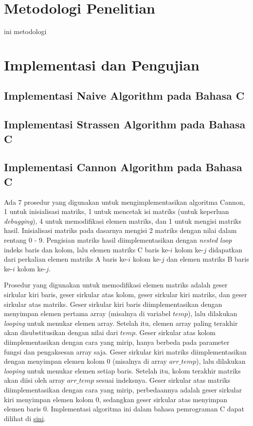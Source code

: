 \documentclass[conference]{IEEEtran}
\begin{document}
\section{Metodologi Penelitian}
ini metodologi

\section{Implementasi dan Pengujian}

\subsection{Implementasi Naive Algorithm pada Bahasa C}

\subsection{Implementasi Strassen Algorithm pada Bahasa C}

\subsection{Implementasi Cannon Algorithm pada Bahasa C}
Ada 7 prosedur yang digunakan untuk mengimplementasikan algoritma Cannon, 1 untuk inisialisasi matriks, 1 untuk mencetak isi matriks (untuk keperluan \textit{debugging}), 
4 untuk memodifikasi elemen matriks, dan 1 untuk mengisi matriks hasil.
Inisialisasi matriks pada dasarnya mengisi 2 matriks dengan nilai dalam rentang 0 - 9.
Pengisian matriks hasil diimplementasikan dengan \textit{nested loop} indeks baris dan kolom, 
lalu elemen matriks C baris ke-$i$ kolom ke-$j$ didapatkan dari perkalian elemen matriks A baris ke-$i$ kolom ke-$j$ dan elemen matriks B baris ke-$i$ kolom ke-$j$.

Prosedur yang digunakan untuk memodifikasi elemen matriks adalah geser sirkular kiri baris, geser sirkular atas kolom, geser sirkular kiri matriks, dan geser sirkular atas matriks.
Geser sirkular kiri baris diimplementasikan dengan menyimpan elemen pertama array (misalnya di variabel $temp$), lalu dilakukan \textit{looping} untuk menukar elemen array.
Setelah itu, elemen array paling terakhir akan disubstitusikan dengan nilai dari $temp$.
Geser sirkular atas kolom diimplementasikan dengan cara yang mirip, hanya berbeda pada parameter fungsi dan pengaksesan array saja.
Geser sirkular kiri matriks diimplementasikan dengan menyimpan elemen kolom 0 (misalnya di array $arr\_temp$), lalu dilakukan \textit{looping} untuk menukar elemen setiap baris.
Setelah itu, kolom terakhir matriks akan diisi oleh array $arr\_temp$ sesuai indeksnya.
Geser sirkular atas matriks diimplementasikan dengan cara yang mirip, 
perbedaannya adalah geser sirkular kiri menyimpan elemen kolom 0, sedangkan geser sirkular atas menyimpan elemen baris 0.
Implementasi algoritma ini dalam bahasa pemrograman C dapat dilihat di
\href{https://github.com/Fariz06/Tugas-5-PMC}{sini}.
\end{document}
